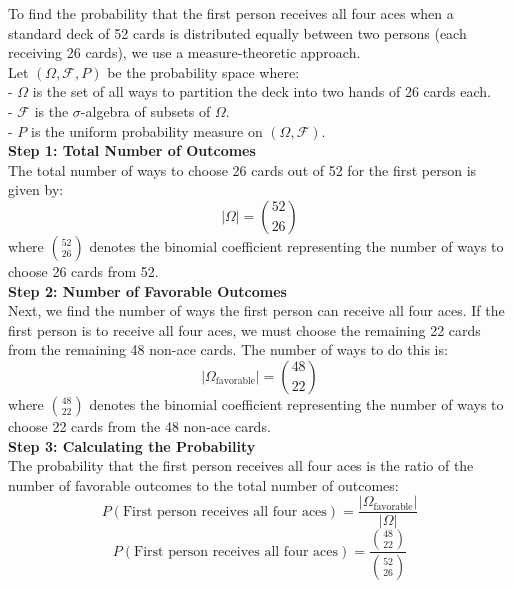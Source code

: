 \begin{solution}
    To find the probability that the first person receives all four aces when a standard deck of 52 cards is distributed equally between two persons (each receiving 26 cards), we use a measure-theoretic approach.\\

    Let \((\Omega, \mathcal{F}, P)\) be the probability space where:\\
    - \(\Omega\) is the set of all ways to partition the deck into two hands of 26 cards each.\\
    - \(\mathcal{F}\) is the \(\sigma\)-algebra of subsets of \(\Omega\).\\
    - \(P\) is the uniform probability measure on \((\Omega, \mathcal{F})\).\\
    
    \textbf{Step 1: Total Number of Outcomes}\\
    
    The total number of ways to choose 26 cards out of 52 for the first person is given by:
    \[
    |\Omega| = \binom{52}{26}
    \]
    where \(\binom{52}{26}\) denotes the binomial coefficient representing the number of ways to choose 26 cards from 52.\\
    
    \textbf{Step 2: Number of Favorable Outcomes}\\
    
    Next, we find the number of ways the first person can receive all four aces. If the first person is to receive all four aces, we must choose the remaining 22 cards from the remaining 48 non-ace cards. The number of ways to do this is:
    \[
    |\Omega_{\text{favorable}}| = \binom{48}{22}
    \]
    where \(\binom{48}{22}\) denotes the binomial coefficient representing the number of ways to choose 22 cards from the 48 non-ace cards.\\
    
    \textbf{Step 3: Calculating the Probability}\\
    
    The probability that the first person receives all four aces is the ratio of the number of favorable outcomes to the total number of outcomes:
    \[
    P(\text{First person receives all four aces}) = \frac{|\Omega_{\text{favorable}}|}{|\Omega|}
    \]
    \[
    P(\text{First person receives all four aces}) = \frac{\binom{48}{22}}{\binom{52}{26}}
    \]
\end{solution}

